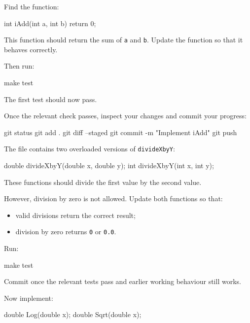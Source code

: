 \documentclass{csc2059practical}
\begin{document}
Find the function:

\begin{cppcode}
int iAdd(int a, int b)
{
    return 0;
}
\end{cppcode}

This function should return the sum of \texttt{a} and \texttt{b}. Update the function so that it behaves correctly.

Then run:

\begin{bashcode}
make test
\end{bashcode}

The first test should now pass.

\Needspace{48mm}
Once the relevant check passes, inspect your changes and commit your progress:

\begin{bashcode}
git status
git add .
git diff --staged
git commit -m "Implement iAdd"
git push
\end{bashcode}


The file contains two overloaded versions of \texttt{divideXbyY}:

\begin{cppcode}
double divideXbyY(double x, double y);
int divideXbyY(int x, int y);
\end{cppcode}

These functions should divide the first value by the second value.

However, division by zero is not allowed. Update both functions so that:

\begin{itemize}
  \item valid divisions return the correct result;
  \item division by zero returns \texttt{0} or \texttt{0.0}.
\end{itemize}

Run:

\begin{bashcode}
make test
\end{bashcode}

Commit once the relevant tests pass and earlier working behaviour still works.


Now implement:

\begin{cppcode}
double Log(double x);
double Sqrt(double x);
\end{cppcode}
\end{document}
